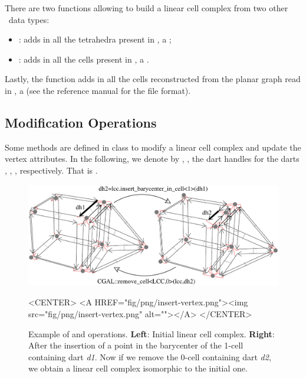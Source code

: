 There are two functions allowing to build a linear cell complex
from two other \cgal\ data types:
\begin{itemize}
\item {}: adds in  all 
  the tetrahedra present in , a ;
\item {}: adds in  all 
  the cells present in , a .
\end{itemize}

Lastly, the function  adds in
 all the cells reconstructed from the planar graph read in
, a  (see the reference manual for the file
format).

\subsection{Modification Operations}\label{ssec-modif-op}

Some methods are defined in  class
to modify a linear cell complex and update the vertex attributes.  In
the following, we denote by , ,  the dart
handles for the darts , , , respectively. That
is .

\begin{figure}[htb]
  \begin{ccTexOnly}
    \begin{center}
      \includegraphics[width=.75\textwidth]{Linear_cell_complex/fig/pdf/insert-vertex}
    \end{center}
  \end{ccTexOnly}
  \begin{ccHtmlOnly}
    <CENTER> <A HREF="fig/png/insert-vertex.png"><img
    src="fig/png/insert-vertex.png" alt=""></A> </CENTER>
  \end{ccHtmlOnly}
  \caption{Example of  and
     operations. \textbf{Left}: Initial linear
    cell complex.  \textbf{Right}: After the insertion of a point in
    the barycenter of the 1-cell containing dart \emph{d1}.  Now if we
    remove the 0-cell containing dart \emph{d2}, we obtain a linear
    cell complex isomorphic to the initial one.}
  \label{fig-lcc-insert-vertex}
\end{figure}

